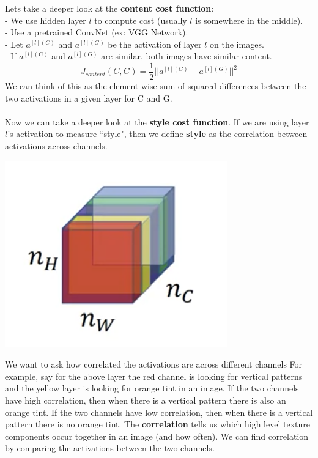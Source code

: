 \documentclass[11pt, a4paper]{article}
\begin{document}
\begin{spacing}{1.1}
	\noindent Lets take a deeper look at the \textbf{content cost function}: \\
	- We use hidden layer $l$ to compute cost (usually $l$ is somewhere in the middle). \\
	- Use a pretrained ConvNet (ex: VGG Network). \\
	- Let $a^{[l](C)}$ and $a^{[l](G)}$ be the activation of layer $l$ on the images. \\
	- If $a^{[l](C)}$ and $a^{[l](G)}$ are similar, both images have similar content.
	$$ J_{content}(C,G) = \frac{1}{2} || a^{[l](C)} - a^{[l](G)}||^2$$
	We can think of this as the element wise sum of squared differences between the two activations in a given layer for C and G. \\~\\
	Now we can take a deeper look at the \textbf{style cost function}. If we are using layer $l$'s activation to measure ``style", then we define \textbf{style} as the correlation between activations across channels.
	\begin{center}
	\includegraphics[scale=0.6]{n_s_corr}
	\end{center}
	We want to ask how correlated the activations are across different channels For example, say for the above layer the red channel is looking for vertical patterns and the yellow layer is looking for orange tint in an image. If the two channels have high correlation, then when there is a vertical pattern there is also an orange tint. If the two channels have low correlation, then when there is a vertical pattern there is no orange tint. The \textbf{correlation} tells us which high level texture components occur together in an image (and how often). We can find correlation by comparing the activations between the two channels. \vspace*{2mm}\\

\end{spacing}
\end{document}
